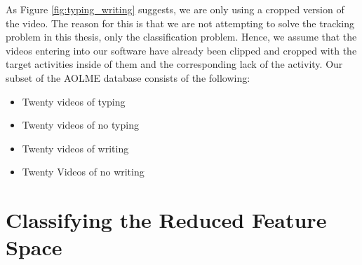 As Figure \ref{fig:typing_writing} suggests, we are only using a cropped version
of the video. The reason for this is that we are not attempting to solve the tracking
problem in this thesis, only the classification problem. Hence, we assume that
the videos entering into our software have already been clipped and cropped with
the target activities inside of them and the corresponding lack of the activity.
Our subset of the AOLME database consists of the following:

\begin{itemize}
\item Twenty videos of typing
\item Twenty videos of no typing
\item Twenty videos of writing
\item Twenty Videos of no writing
\end{itemize}

\section{\label{section:classification}Classifying the Reduced Feature Space}
